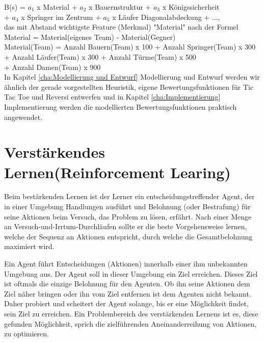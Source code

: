 B(s) = $a_1$ x Material +  $a_2$ x Bauernstruktur + $a_3$ x Königssicherheit \\
\tab \tab + $a_4$ x Springer im Zentrum + $a_5$ x Läufer Diagonalabdeckung + ..., \\ 

das mit Abstand wichtigste Feature (Merkmal) "Material" nach der Formel \\

\tab \tab Material = Material(eigenes Team) - Material(Gegner) \\

Material(Team) = Anzahl Bauern(Team) x 100 + Anzahl Springer(Team) x 300 \\
\tab \tab \tab + Anzahl Läufer(Team) x 300 + Anzahl Türme(Team) x 500 \\
\tab \tab \tab + Anzahl Damen(Team) x 900 \\

In Kapitel \ref{cha:Modellierung und Entwurf} Modellierung und Entwurf werden wir ähnlich der gerade vorgestellten Heuristik, eigene Bewertungsfunktionen für Tic Tac Toe und Reversi entwerfen und in Kapitel \ref{cha:Implementierung} Implementierung werden die modellierten Bewertungsfunktionen praktisch angewendet.

\section{Verstärkendes Lernen(Reinforcement Learing)}
\label{sec:Verstärkendes Lernen}
Beim bestärkenden Lernen ist der Lerner ein entscheidungstreffender Agent, der in einer Umgebung Handlungen ausführt und Belohnung (oder Bestrafung) für seine Aktionen beim Versuch, das Problem zu lösen, erfährt. Nach einer Menge an Versuch-und-Irrtum-Durchläufen sollte er die beste Vorgehensweise lernen, welche der Sequenz an Aktionen entspricht, durch welche die Gesamtbelohnung maximiert wird\cite[397]{Alpaydin}.

Ein Agent führt Entscheidungen (Aktionen) innerhalb einer ihm unbekannten Umgebung aus. Der Agent soll in dieser Umgebung ein Ziel erreichen. Dieses Ziel ist oftmals die einzige Belohnung für den Agenten. Ob ihn seine Aktionen dem Ziel näher bringen oder ihn vom Ziel entfernen ist dem Agenten nicht bekannt. Daher probiert und scheitert der Agent solange, bis er eine Möglichkeit findet, sein Ziel zu erreichen. Ein Problembereich des verstärkenden Lernens ist es, diese gefunden Möglichkeit, sprich die zielführenden Aneinanderreihung von Aktionen, zu optimieren.

